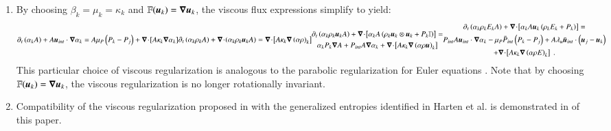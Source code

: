 \documentclass[preprint,10pt]{elsarticle}
\begin{document}
\begin{enumerate}
\item{By choosing $\beta_k = \mu_k = \kappa_k$ and $\mathbb{F}(\boldsymbol u_k) = \boldsymbol\nabla \boldsymbol u_k$, the viscous flux expressions simplify to yield: 
\begin{subequations}\label{eq:sev_equ-parab}
\begin{align}\label{eq:sev_equ-parab-vf}
\partial_t \left( \alpha_k  A\right) + A \mbold u_{int} \cdot \grad \alpha_k = A \mu_P \left( P_k - P_j \right) + \div \left[ A \kappa_k \grad \alpha_k \right]
\end{align}
\begin{align}\label{eq:sev_equ-parab-cont}
\partial_t \left( \alpha_k \rho_k A \right) + \div \left( \alpha_k \rho_k \mbold u_k A \right) = \div \left[ A \kappa_k \grad \left( \alpha \rho \right)_k \right]
\end{align}
\begin{multline}\label{eq:sev_equ-parab-mom}
\partial_t \left( \alpha_k \rho_k \mbold u_k A \right) + \div \left[ \alpha_k A \left( \rho_k \mbold u_k \otimes \mbold u_k + P_k \mathbb{I} \right) \right] = \\
\alpha_k P_k \grad A + P_{int} A \grad \alpha_k + \div \left[ A \kappa_k \grad \left( \alpha \rho \mbold u  \right)_k \right] 
\end{multline}
\begin{multline}\label{eq:sev_equ-parab-ener}
\partial_t \left( \alpha_k \rho_k E_k A \right) + \div \left[ \alpha_k A \mbold u_k \left( \rho_k E_k + P_k \right) \right] = \\
P_{int} A \mbold u_{int} \cdot \grad \alpha_k -
\mu_P \bar{P}_{int} \left( P_k-P_j \right) + 
A \lambda_u \bar{\mbold u}_{int} \cdot \left( \mbold u_j - \mbold u_k \right)  \\
+ \div \left[A \kappa_k \grad \left( \alpha \rho E \right)_k \right] \ .
\end{multline} 
\end{subequations}
This particular choice of viscous regularization is analogous to the parabolic regularization for Euler equations \cite{Parabolic}. Note that by choosing $\mathbb{F}(\boldsymbol u_k) = \boldsymbol\nabla \boldsymbol u_k$, the viscous regularization is no longer rotationally invariant.
}
    
\item{Compatibility of the viscous regularization proposed in  with the generalized entropies identified in Harten et al. \cite{Harten} is demonstrated in  of this paper. } 
\end{enumerate}
\end{document}
